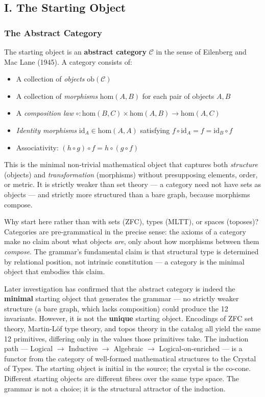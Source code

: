 \documentclass[12pt,a4paper]{article}
\begin{document}
\subsection{I. The Starting Object}

\subsubsection{The Abstract Category}

The starting object is an \textbf{abstract category} $\mathcal{C}$ in the sense of Eilenberg and Mac Lane (1945). A category consists of:

\begin{itemize}
    \item A collection of \emph{objects} $\text{ob}(\mathcal{C})$
    \item A collection of \emph{morphisms} $\text{hom}(A, B)$ for each pair of objects $A, B$
    \item A \emph{composition law} $\circ: \text{hom}(B,C) \times \text{hom}(A,B) \to \text{hom}(A,C)$
    \item \emph{Identity morphisms} $\text{id}_A \in \text{hom}(A,A)$ satisfying $f \circ \text{id}_A = f = \text{id}_B \circ f$
    \item Associativity: $(h \circ g) \circ f = h \circ (g \circ f)$
\end{itemize}

This is the minimal non-trivial mathematical object that captures both \emph{structure} (objects) and \emph{transformation} (morphisms) without presupposing elements, order, or metric. It is strictly weaker than set theory --- a category need not have sets as objects --- and strictly more structured than a bare graph, because morphisms compose.

Why start here rather than with sets (ZFC), types (MLTT), or spaces (toposes)? Categories are pre-grammatical in the precise sense: the axioms of a category make no claim about what objects \emph{are}, only about how morphisms between them \emph{compose}. The grammar's fundamental claim is that structural type is determined by relational position, not intrinsic constitution --- a category is the minimal object that embodies this claim.

Later investigation has confirmed that the abstract category is indeed the \textbf{minimal} starting object that generates the grammar --- no strictly weaker structure (a bare graph, which lacks composition) could produce the 12 invariants. However, it is not the \textbf{unique} starting object. Encodings of ZFC set theory, Martin-L\"of type theory, and topos theory in the catalog all yield the same 12 primitives, differing only in the values those primitives take. The induction path --- Logical $\to$ Inductive $\to$ Algebraic $\to$ Logical-on-enriched --- is a functor from the category of well-formed mathematical structures to the Crystal of Types. The starting object is initial in the source; the crystal is the co-cone. Different starting objects are different fibres over the same type space. The grammar is not a choice; it is the structural attractor of the induction.
\end{document}

